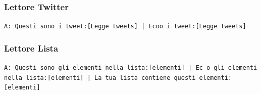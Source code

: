 \subsubsection{Lettore Twitter}
\texttt{A: Questi sono i tweet:[Legge tweets] | Ecoo i tweet:[Legge tweets]}\\

\subsubsection{Lettore Lista}
\texttt{A: Questi sono gli elementi nella lista:[elementi] | Ec o gli elementi nella lista:[elementi] | La tua lista contiene questi elementi: [elementi] }\\



